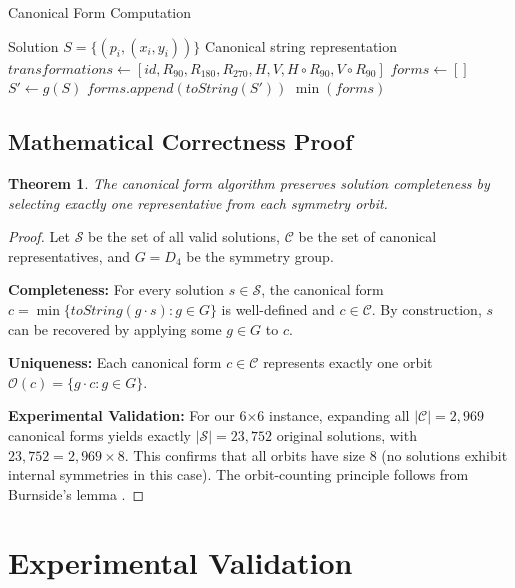 \documentclass[12pt,a4paper]{article}
\newtheorem{theorem}{Theorem}[section]
\theoremstyle{definition}
\begin{document}
\begin{algorithm}
\caption{Canonical Form Computation}
\begin{algorithmic}[1]
\REQUIRE Solution $S = \{(p_i, (x_i, y_i))\}$
\ENSURE Canonical string representation
\STATE $transformations \leftarrow [id, R_{90}, R_{180}, R_{270}, H, V, H \circ R_{90}, V \circ R_{90}]$
\STATE $forms \leftarrow []$
    \STATE $S' \leftarrow g(S)$
    \STATE $forms.append(toString(S'))$
\ENDFOR
\RETURN $\min(forms)$ 
\end{algorithmic}
\end{algorithm}

\subsection{Mathematical Correctness Proof}

\begin{theorem}
The canonical form algorithm preserves solution completeness by selecting exactly one representative from each symmetry orbit.
\end{theorem}

\begin{proof}
Let $\mathcal{S}$ be the set of all valid solutions, $\mathcal{C}$ be the set of canonical representatives, and $G = D_4$ be the symmetry group.

\textbf{Completeness:} For every solution $s \in \mathcal{S}$, the canonical form $c = \min\{toString(g \cdot s) : g \in G\}$ is well-defined and $c \in \mathcal{C}$. By construction, $s$ can be recovered by applying some $g \in G$ to $c$.

\textbf{Uniqueness:} Each canonical form $c \in \mathcal{C}$ represents exactly one orbit $\mathcal{O}(c) = \{g \cdot c : g \in G\}$.

\textbf{Experimental Validation:} For our 6$\times$6 instance, expanding all $|\mathcal{C}| = 2,969$ canonical forms yields exactly $|\mathcal{S}| = 23,752$ original solutions, with $23,752 = 2,969 \times 8$. This confirms that all orbits have size 8 (no solutions exhibit internal symmetries in this case). The orbit-counting principle follows from Burnside's lemma \cite{brualdi2010}.
\end{proof}

\section{Experimental Validation}
\end{document}
